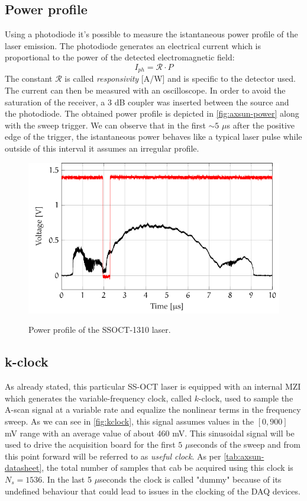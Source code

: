 \subsection{Power profile}
Using a photodiode it's possible to measure the istantaneous power profile of the laser emission. The photodiode generates an electrical current which is proportional to the power of the detected electromagnetic field: 
\begin{equation}
	I_{ph} = \mathcal{R} \cdot P 
\end{equation}
The constant $\mathcal{R}$ is called \emph{responsivity} [A/W] and is specific to the detector used. The current can then be measured with an oscilloscope. In order to avoid the saturation of the receiver, a 3 dB coupler was inserted between the source and the photodiode. The obtained power profile is depicted in \autoref{fig:axsun-power} along with the sweep trigger. We can observe that in the first $\sim 5$ $\mu$s after the positive edge of the trigger, the istantaneous power behaves like a typical laser pulse while outside of this interval it assumes an irregular profile. 


\begin{figure}[hbt]
	\myfloatalign
	{\includegraphics[width=0.8\linewidth]{gfx/ch3/power-profile}}\\
	\caption{Power profile of the SSOCT-1310 laser.}\label{fig:axsun-power}
\end{figure}


\subsection{k-clock}
As already stated, this particular SS-OCT laser is equipped with an internal \ac{MZI} which generates the variable-frequency clock, called $k$-clock, used to sample the A-scan signal at a variable rate and equalize the nonlinear terms in the frequency sweep. As we can see in \autoref{fig:kclock}, this signal assumes values in the $[0, 900]$ mV range with an average value of about 460 mV. This sinusoidal signal will be used to drive the acquisition board for the first $5$ $\mu$seconds of the sweep and from this point forward will be referred to as \emph{useful clock}. As per \autoref{tab:axsun-datasheet}, the total number of samples that cab be acquired using this clock is $N_s = 1536$. In the last 5 $\mu$seconds the clock is called "dummy" because of its undefined behaviour that could lead to issues in the clocking of the DAQ devices.

